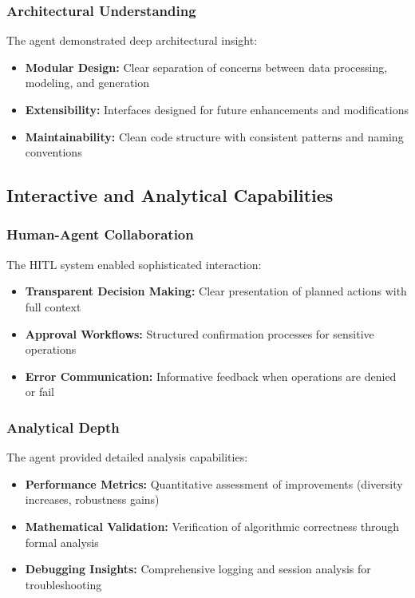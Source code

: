 \documentclass[12pt, a4paper]{article}
\begin{document}
\subsubsection{Architectural Understanding}
The agent demonstrated deep architectural insight:
\begin{itemize}
    \item \textbf{Modular Design:} Clear separation of concerns between data processing, modeling, and generation
    \item \textbf{Extensibility:} Interfaces designed for future enhancements and modifications
    \item \textbf{Maintainability:} Clean code structure with consistent patterns and naming conventions
\end{itemize}

\subsection{Interactive and Analytical Capabilities}

\subsubsection{Human-Agent Collaboration}
The HITL system enabled sophisticated interaction:
\begin{itemize}
    \item \textbf{Transparent Decision Making:} Clear presentation of planned actions with full context
    \item \textbf{Approval Workflows:} Structured confirmation processes for sensitive operations
    \item \textbf{Error Communication:} Informative feedback when operations are denied or fail
\end{itemize}

\subsubsection{Analytical Depth}
The agent provided detailed analysis capabilities:
\begin{itemize}
    \item \textbf{Performance Metrics:} Quantitative assessment of improvements (diversity increases, robustness gains)
    \item \textbf{Mathematical Validation:} Verification of algorithmic correctness through formal analysis
    \item \textbf{Debugging Insights:} Comprehensive logging and session analysis for troubleshooting
\end{itemize}
\end{document}
